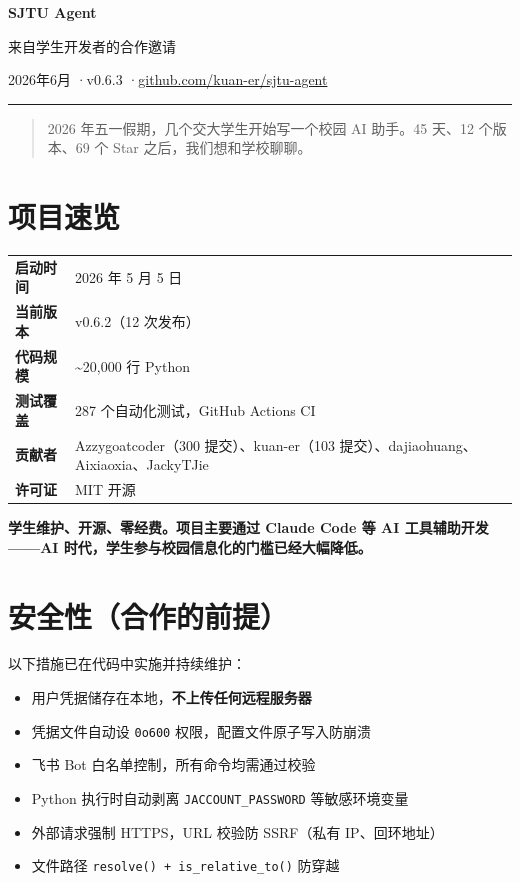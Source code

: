 \documentclass[11pt,a4paper]{ctexart}
\begin{document}
\begin{center}
    {\LARGE \textbf{SJTU Agent}}
    \vspace{0.3em}

    {\large 来自学生开发者的合作邀请}
    \vspace{0.5em}

    \small 2026年6月 \quad·\quad v0.6.3 \quad·\quad \href{https://github.com/kuan-er/sjtu-agent}{github.com/kuan-er/sjtu-agent}
\end{center}

\vspace{0.5em}
\hrule
\vspace{0.5em}

\begin{quote}\small
2026 年五一假期，几个交大学生开始写一个校园 AI 助手。45 天、12 个版本、69 个 Star 之后，我们想和学校聊聊。
\end{quote}

\section*{项目速览}

\begin{tabularx}{\textwidth}{lX}
\textbf{启动时间} & 2026 年 5 月 5 日 \\
\textbf{当前版本} & v0.6.2（12 次发布）\\
\textbf{代码规模} & \textasciitilde20,000 行 Python \\
\textbf{测试覆盖} & 287 个自动化测试，GitHub Actions CI \\
\textbf{贡献者} & Azzygoatcoder（300 提交）、kuan-er（103 提交）、dajiaohuang、Aixiaoxia、JackyTJie \\
\textbf{许可证} & MIT 开源 \\
\end{tabularx}

\vspace{0.3em}
\textbf{学生维护、开源、零经费。项目主要通过 Claude Code 等 AI 工具辅助开发——AI 时代，学生参与校园信息化的门槛已经大幅降低。}

\section{安全性（合作的前提）}

以下措施已在代码中实施并持续维护：
\begin{itemize}
    \item 用户凭据储存在本地，\textbf{不上传任何远程服务器}
    \item 凭据文件自动设 \texttt{0o600} 权限，配置文件原子写入防崩溃
    \item 飞书 Bot 白名单控制，所有命令均需通过校验
    \item Python 执行时自动剥离 \texttt{JACCOUNT\_PASSWORD} 等敏感环境变量
    \item 外部请求强制 HTTPS，URL 校验防 SSRF（私有 IP、回环地址）
    \item 文件路径 \texttt{resolve() + is\_relative\_to()} 防穿越
\end{itemize}
\end{document}
